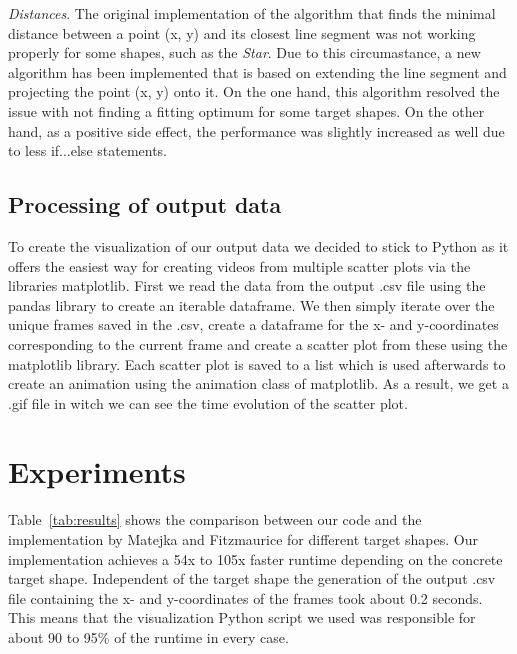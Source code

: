 \documentclass[sigconf]{acmart}
\begin{document}
\textit{Distances}. The original implementation of the algorithm that finds the minimal distance between a point (x, y) and its closest line segment was not working properly for some shapes, such as the \textit{Star}. Due to this circumastance, a new algorithm has been implemented that is based on extending the line segment and projecting the point (x, y) onto it. On the one hand, this algorithm resolved the issue with not finding a fitting optimum for some target shapes. On the other hand, as a positive side effect, the performance was slightly increased as well due to less if...else statements.

\subsection{Processing of output data}
\label{sub:sec:output}
To create the visualization of our output data we decided to stick to Python as it offers the easiest way for creating videos from multiple scatter plots via the libraries matplotlib. First we read the data from the output .csv file using the pandas library to create an iterable dataframe. 
We then simply iterate over the unique frames saved in the .csv, create a dataframe for the x- and y-coordinates corresponding to the current frame and create a scatter plot from these using the matplotlib library.\newpage
Each scatter plot is saved to a list which is used afterwards to create an animation
using the animation class of matplotlib. As a result, we get a .gif file in witch we can see the time evolution of the scatter plot. 

\section{Experiments} \label{experiments}
Table~\ref*{tab:results} shows the comparison between our code and the implementation by Matejka and Fitzmaurice for different target shapes. Our implementation achieves a 54x to 105x faster runtime depending on the concrete target shape. Independent of the target shape the
generation of the output .csv file containing the x- and y-coordinates of the frames took about 0.2 seconds. This means that the visualization Python script we used was responsible for about 90 to 95\% of the runtime in every case. 
\end{document}
